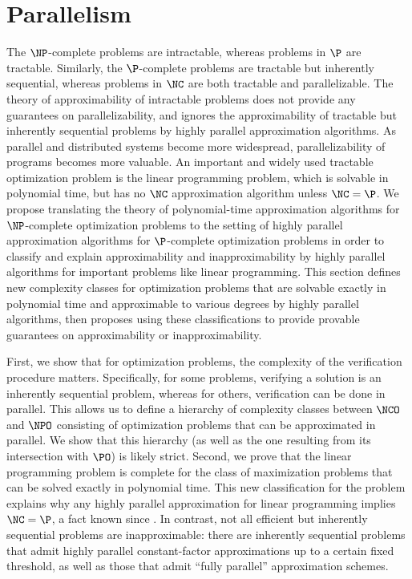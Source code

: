 \documentclass{article}
\begin{document}
\section{Parallelism}
\label{sec:par}
%
%
%
The $\NP$-complete problems are intractable, whereas problems in $\P$ are tractable.
Similarly, the $\P$-complete problems are tractable but inherently sequential, whereas problems in $\NC$ are both tractable and parallelizable.
%
%
The theory of approximability of intractable problems does not provide any guarantees on parallelizability, and ignores the approximability of tractable but inherently sequential problems by highly parallel approximation algorithms.
As parallel and distributed systems become more widespread, parallelizability of programs becomes more valuable.
An important and widely used tractable optimization problem is the linear programming problem, which is solvable in polynomial time, but has no $\NC$ approximation algorithm unless $\NC = \P$.
%
%
We propose translating the theory of polynomial-time approximation algorithms for $\NP$-complete optimization problems to the setting of highly parallel approximation algorithms for $\P$-complete optimization problems in order to classify and explain approximability and inapproximability by highly parallel algorithms for important problems like linear programming.
%
%
This section defines new complexity classes for optimization problems that are solvable exactly in polynomial time and approximable to various degrees by highly parallel algorithms, then proposes using these classifications to provide provable guarantees on approximability or inapproximability.

%
%
%
First, we show that for optimization problems, the complexity of the verification procedure matters.
Specifically, for some problems, verifying a solution is an inherently sequential problem, whereas for others, verification can be done in parallel.
This allows us to define a hierarchy of complexity classes between $\NCO$ and $\NPO$ consisting of optimization problems that can be approximated in parallel.
We show that this hierarchy (as well as the one resulting from its intersection with $\PO$) is likely strict.
Second, we prove that the linear programming problem is complete for the class of maximization problems that can be solved exactly in polynomial time.
This new classification for the problem explains why any highly parallel approximation for linear programming implies $\NC = \P$, a fact known since .
In contrast, not all efficient but inherently sequential problems are inapproximable: there are inherently sequential problems that admit highly parallel constant-factor approximations up to a certain fixed threshold, as well as those that admit ``fully parallel'' approximation schemes.
\end{document}
